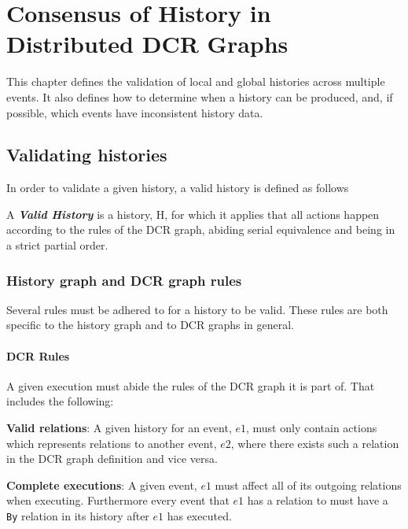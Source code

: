 \chapter{Consensus of History in Distributed DCR Graphs}
\label{chap:consensusindcr}
	This chapter defines the validation of local and global histories across multiple events. It also defines how to determine when a history can be produced, and, if possible, which events have inconsistent history data.
	 

	
	\section{Validating histories}
	In order to validate a given history, a valid history is defined as follows
	
		\begin{definition}
			A \textit{\textbf{Valid History}} is a history, H, for which it applies that all actions happen according to the rules of the DCR graph, abiding serial equivalence and being in a strict partial order. 
		\end{definition}
	
	\subsection{History graph and DCR graph rules}
	Several rules must be adhered to for a history to be valid. These rules are both specific to the history graph and to DCR graphs in general. 
		
	\subsubsection{DCR Rules}
	A given execution must abide the rules of the DCR graph it is part of. That includes the following:
	
	\newpar \textbf{Valid relations}: A given history for an event, $e1$, must only contain actions which represents relations to another event, $e2$, where there exists such a relation in the DCR graph definition and vice versa. 
	
	\newpar \textbf{Complete executions}: A given event, $e1$ must affect all of its outgoing relations when executing. Furthermore every event that $e1$ has a relation to must have a \texttt{By} relation in its history after $e1$ has executed.
	
